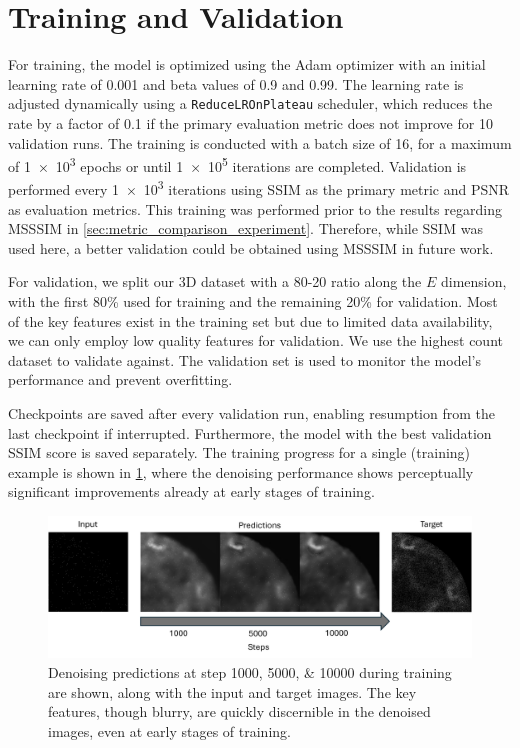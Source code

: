 \section{Training and Validation}
For training, the model is optimized using the Adam optimizer with an initial learning rate of \num{0.001} and beta values of \num{0.9} and \num{0.99}. The learning rate is adjusted dynamically using a \texttt{ReduceLROnPlateau} scheduler, which reduces the rate by a factor of \num{0.1} if the primary evaluation metric does not improve for \num{10} validation runs. The training is conducted with a batch size of \num{16}, for a maximum of \num{1e3} epochs or until \num{1e5} iterations are completed. Validation is performed every \num{1e3} iterations using \gls{SSIM} as the primary metric and \gls{PSNR} as evaluation metrics. This training was performed prior to the results regarding \gls{MSSSIM} in \cref{sec:metric_comparison_experiment}. Therefore, while \gls{SSIM} was used here, a better validation could be obtained using \gls{MSSSIM} in future work.

For validation, we split our 3D dataset with a 80-20 ratio along the $E$ dimension, with the first 80\% used for training and the remaining 20\% for validation. Most of the key features exist in the training set but due to limited data availability, we can only employ low quality features for validation. We use the highest count dataset to validate against. The validation set is used to monitor the model's performance and prevent overfitting. 

Checkpoints are saved after every validation run, enabling resumption from the last checkpoint if interrupted. Furthermore, the model with the best validation \gls{SSIM} score is saved separately. The training progress for a single (training) example is shown in \cref{fig:training-progress-example}, where the denoising performance shows perceptually significant improvements already at early stages of training.



\begin{figure}
    \centering
    \includegraphics[width=1\linewidth]{images/training_progress_example2.pdf}
    \caption{Denoising predictions at step \numlist{1000;5000;10000} during training are shown, along with the input and target images. The key features, though blurry, are quickly discernible in the denoised images, even at early stages of training.}
    \label{fig:training-progress-example}
\end{figure}

